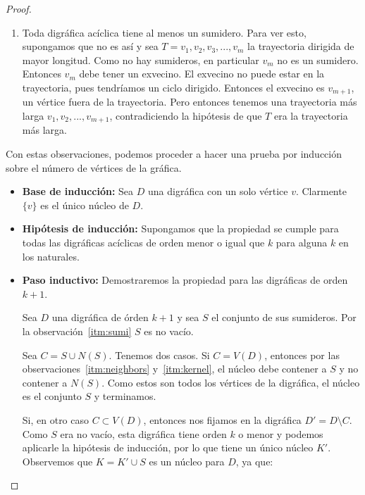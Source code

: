 \documentclass{article}
\begin{document}
\begin{enumerate}
\begin{proof}
\begin{enumerate}
      \item \label{itm:sumi} Toda digr\'afica ac\'iclica tiene al menos
        un sumidero. Para ver esto, supongamos que no es as\'i y sea $T = v_1, v_2,
        v_3, ..., v_m$ la trayectoria dirigida de mayor longitud. Como no hay
        sumideros, en particular $v_m$ no es un sumidero. Entonces $v_m$ debe
        tener un exvecino. El exvecino no puede estar en la trayectoria, pues
        tendr\'iamos un ciclo dirigido. Entonces el exvecino es $v_{m+1}$, un
        v\'ertice fuera de la trayectoria. Pero entonces tenemos una trayectoria
        m\'as larga $v_1, v_2, ..., v_{m+1}$, contradiciendo la hip\'otesis de que
        $T$ era la trayectoria m\'as larga.
      \end{enumerate}
      
      
      Con estas observaciones, podemos proceder a hacer una prueba por
      inducci\'on sobre el n\'umero de v\'ertices de la gr\'afica. 
      
      \begin{itemize}
      \item \textbf{Base de inducci\'on:}
        Sea $D$ una digr\'afica con un solo v\'ertice $v$. Clarmente $\{v\}$ es el
        \'unico n\'ucleo de $D$.
      \item \textbf{Hip\'otesis de inducci\'on:}
        Supongamos que la propiedad se cumple para todas las digr\'aficas ac\'iclicas de
        orden menor o igual que $k$ para alguna $k$ en los naturales.
      \item \textbf{Paso inductivo:}
        Demostraremos la propiedad para las digr\'aficas de orden $k+1$.
        
        Sea $D$ una digr\'afica de \'orden $k+1$ y sea $S$ el conjunto de sus
        sumideros. Por la observaci\'on~\ref{itm:sumi} $S$ es no
        vac\'io.
        
        Sea $C = S \cup N(S)$. Tenemos dos casos. Si $C = V(D)$, entonces por
        las observaciones~\ref{itm:neighbors} y~\ref{itm:kernel}, el n\'ucleo debe
        contener a $S$ y no contener a $N(S)$. Como estos son todos los v\'ertices
        de la digr\'afica, el n\'ucleo es el conjunto $S$ y terminamos.

        Si, en otro caso $C \subset V(D)$, entonces nos fijamos en la digr\'afica
        $D' = D \setminus C$. Como $S$ era no vac\'io, esta digr\'afica tiene orden
        $k$ o menor y podemos aplicarle la hip\'otesis de inducci\'on, por lo que
        tiene un \'unico n\'ucleo $K'$. Observemos que $K = K' \cup S$ es un n\'ucleo para
        $D$, ya que:


\end{itemize}
\end{proof}
\end{enumerate}
\end{document}
